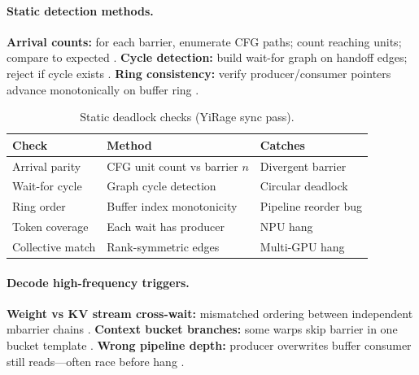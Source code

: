 \paragraph{Static detection methods.}
\textbf{Arrival counts:} for each barrier, enumerate CFG paths; count reaching units; compare to expected \citep{yirage2026,chen2020compilerbasedhardw,shah2024flashattention3}.
\textbf{Cycle detection:} build wait-for graph on handoff edges; reject if cycle exists \citep{wu2024mirage,mpk2025}.
\textbf{Ring consistency:} verify producer/consumer pointers advance monotonically on buffer ring \citep{semianalysis2024tma,dao2022flashattention}.

\begin{table}[t]
\centering
\small
\caption{Static deadlock checks (YiRage sync pass).}
\label{tab:ch09_deadlock_checks}
\begin{tabular}{@{}p{2.4cm}p{4.2cm}p{2.0cm}@{}}
\toprule
\textbf{Check} & \textbf{Method} & \textbf{Catches} \\
\midrule
Arrival parity & CFG unit count vs barrier $n$ & Divergent barrier \\
Wait-for cycle & Graph cycle detection & Circular deadlock \\
Ring order & Buffer index monotonicity & Pipeline reorder bug \\
Token coverage & Each wait has producer & NPU hang \\
Collective match & Rank-symmetric edges & Multi-GPU hang \\
\bottomrule
\end{tabular}
\end{table}

\paragraph{Decode high-frequency triggers.}
\textbf{Weight vs KV stream cross-wait:} mismatched ordering between independent mbarrier chains \citep{kwon2023vllm,dao2023flashdecoding,shah2024flashattention3}.
\textbf{Context bucket branches:} some warps skip barrier in one bucket template \citep{nvidia2024cudagraphs,yirage2026,patel2025llminference}.
\textbf{Wrong pipeline depth:} producer overwrites buffer consumer still reads---often race before hang \citep{semianalysis2024tma,memoryfloor2026,taxbreak2026}.

